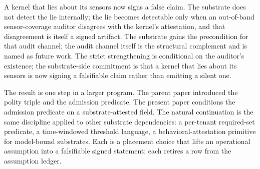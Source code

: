 A kernel that lies about its sensors now signs a false claim. The substrate does not detect the lie internally; the lie becomes detectable only when an out-of-band sensor-coverage auditor disagrees with the kernel's attestation, and that disagreement is itself a signed artifact. The substrate gains the precondition for that audit channel; the audit channel itself is the structural complement and is named as future work. The strict strengthening is conditional on the auditor's existence; the substrate-side commitment is that a kernel that lies about its sensors is now signing a falsifiable claim rather than emitting a silent one.

The result is one step in a larger program. The parent paper introduced the polity triple and the admission predicate. The present paper conditions the admission predicate on a substrate-attested field. The natural continuation is the same discipline applied to other substrate dependencies: a per-tenant required-set predicate, a time-windowed threshold language, a behavioral-attestation primitive for model-bound substrates. Each is a placement choice that lifts an operational assumption into a falsifiable signed statement; each retires a row from the assumption ledger.
